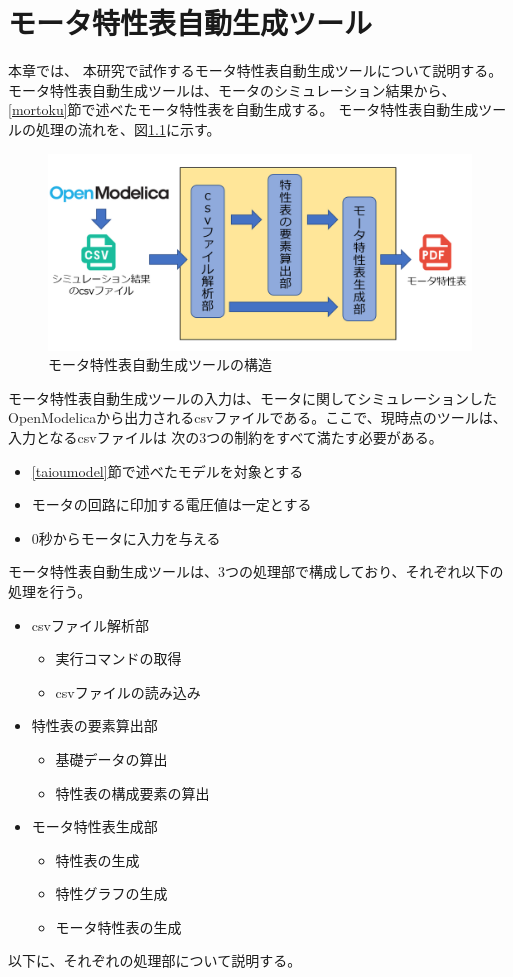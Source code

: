 \chapter{モータ特性表自動生成ツール}\label{cha:Tool}
本章では、 本研究で試作するモータ特性表自動生成ツールについて説明する。
モータ特性表自動生成ツールは、モータのシミュレーション結果から、\ref{mortoku}節で述べたモータ特性表を自動生成する。
モータ特性表自動生成ツールの処理の流れを、図\ref{fig:kouzou}に示す。
\begin{figure}[t]
	\centering
	\includegraphics[width=14cm]{./Image/kouzou.png}
    \caption{モータ特性表自動生成ツールの構造}
	\label{fig:kouzou}
  \end{figure}
モータ特性表自動生成ツールの入力は、モータに関してシミュレーションしたOpenModelicaから出力されるcsvファイルである。ここで、現時点のツールは、入力となるcsvファイルは
次の3つの制約をすべて満たす必要がある。
\begin{itemize}
    \item \ref{taioumodel}節で述べたモデルを対象とする
    \item モータの回路に印加する電圧値は一定とする
    \item 0秒からモータに入力を与える
\end{itemize}


モータ特性表自動生成ツールは、3つの処理部で構成しており、それぞれ以下の処理を行う。
\begin{itemize}
    \item csvファイル解析部
    \begin{itemize}
        \item 実行コマンドの取得
        \item csvファイルの読み込み
    \end{itemize}
    \item 特性表の要素算出部
    \begin{itemize}
        \item 基礎データの算出
        \item 特性表の構成要素の算出
    \end{itemize}
    \item モータ特性表生成部
    \begin{itemize}
        \item 特性表の生成
        \item 特性グラフの生成
        \item モータ特性表の生成
    \end{itemize}
\end{itemize}
以下に、それぞれの処理部について説明する。
